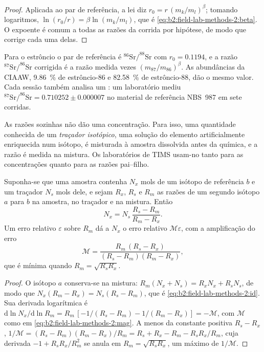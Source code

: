\begin{proof}
Aplicada ao par de referência, a lei diz $r_0 = r\,(m_k/m_l)^\beta$; tomando logaritmos,
$\ln(r_0/r) = \beta\ln(m_k/m_l)$, que é \eqref{eq:b2:field-lab-methods-2:beta}. O expoente é
comum a todas as razões da corrida por hipótese, de modo que corrige cada uma delas.
\end{proof}

Para o estrôncio o par de referência é $^{86}\mathrm{Sr}/^{88}\mathrm{Sr}$ com $r_0 = 0.1194$, e
a razão $^{87}\mathrm{Sr}/^{86}\mathrm{Sr}$ corrigida é a razão medida vezes
$(m_{87}/m_{86})^\beta$. As abundâncias da CIAAW, \qty{9.86}{\percent} de estrôncio-86 e
\qty{82.58}{\percent} de estrôncio-88, dão o mesmo valor. Cada sessão também analisa um : um laboratório mediu $^{87}\mathrm{Sr}/^{86}\mathrm{Sr} = 0.710252 \pm
0.000007$ no material de referência NBS~987 em sete corridas.

As razões sozinhas não dão uma concentração. Para isso, uma quantidade conhecida de um \emph{traçador isotópico}, uma solução do
elemento artificialmente enriquecida num isótopo, é misturada à amostra dissolvida antes da
química, e a razão é medida na mistura. Os laboratórios de TIMS usam-no tanto para as
concentrações quanto para as razões pai--filho.

\begin{proposition}\label{prop:b2:field-lab-methods-2:id}
Suponha-se que uma amostra contenha $N_x$ mols de um isótopo de referência $b$ e um traçador $N_s$ mols dele, e sejam
$R_x$, $R_s$ e $R_m$ as razões de um segundo isótopo $a$ para $b$ na amostra, no traçador e
na mistura. Então
\begin{equation}
N_x = N_s\,\frac{R_s - R_m}{R_m - R_x} .
\label{eq:b2:field-lab-methods-2:id}
\end{equation}
Um erro relativo $\varepsilon$ sobre $R_m$ dá a $N_x$ o erro relativo $\mathcal{M}\varepsilon$,
com a amplificação do erro
\begin{equation}
\mathcal{M} = \frac{R_m\,(R_s - R_x)}{(R_s - R_m)(R_m - R_x)} ,
\label{eq:b2:field-lab-methods-2:mag}
\end{equation}
que é mínima quando $R_m = \sqrt{R_s R_x}$.
\end{proposition}

\begin{proof}
O isótopo $a$ conserva-se na mistura: $R_m(N_x + N_s) = R_x N_x + R_s N_s$, de modo que $N_x(R_m - R_x) =
N_s(R_s - R_m)$, que é \eqref{eq:b2:field-lab-methods-2:id}. Sua derivada logarítmica é
$\mathrm{d}\ln N_x/\mathrm{d}\ln R_m = R_m\,[-1/(R_s - R_m) - 1/(R_m - R_x)] = -\mathcal{M}$, com
$\mathcal{M}$ como em \eqref{eq:b2:field-lab-methods-2:mag}. A menos da constante positiva $R_s - R_x$,
$1/\mathcal{M} = (R_s - R_m)(R_m - R_x)/R_m = R_s + R_x - R_m - R_sR_x/R_m$, cuja derivada
$-1 + R_sR_x/R_m^2$ se anula em $R_m = \sqrt{R_sR_x}$, um máximo de $1/\mathcal{M}$.
\end{proof}

